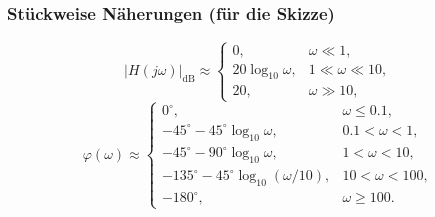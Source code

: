 \subsubsection*{Stückweise Näherungen (für die Skizze)}
\[
|H(j\omega)|_{\mathrm{dB}}\approx
\begin{cases}
0,& \omega\ll 1,\\[2pt]
20\log_{10}\omega,& 1\ll\omega\ll 10,\\[2pt]
20,& \omega\gg 10,
\end{cases}
\]
\[
\varphi(\omega)\approx
\begin{cases}
0^\circ,& \omega\le 0.1,\\[2pt]
-45^\circ-45^\circ\log_{10}\omega,& 0.1<\omega<1,\\[2pt]
-45^\circ-90^\circ\log_{10}\omega,& 1<\omega<10,\\[2pt]
-135^\circ-45^\circ\log_{10}(\omega/10),& 10<\omega<100,\\[2pt]
-180^\circ,& \omega\ge 100.
\end{cases}
\]

\newpage